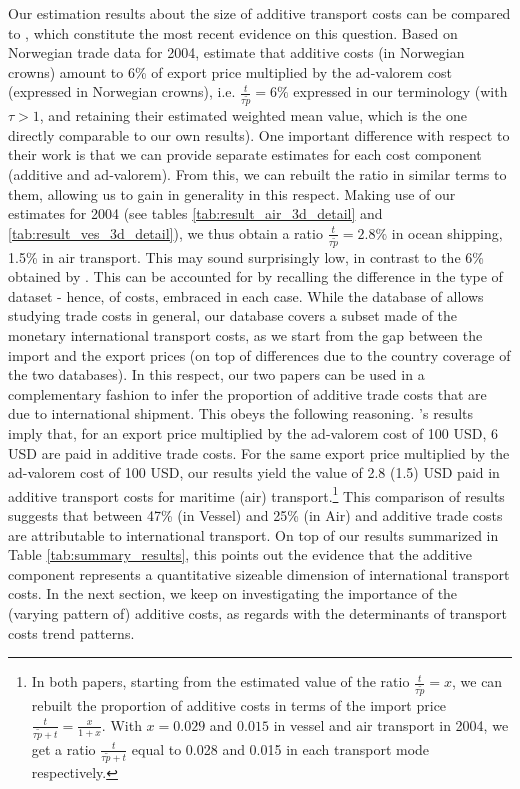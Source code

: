 \documentclass[a4paper,11pt]{article}
\begin{document}
Our estimation results about the size of additive transport costs can be compared to \citet{Irrazabal_2015}, which constitute the most recent evidence on this question. Based on Norwegian trade data for 2004, \citet{Irrazabal_2015} estimate that additive costs (in Norwegian crowns) amount to 6\% of export price multiplied by the ad-valorem cost (expressed in Norwegian crowns), i.e. $\frac{t}{\tau\widetilde{p}}=6\%$ expressed in our terminology (with $\tau>1$, and retaining their estimated weighted mean value, which is the one directly comparable to our own results). One important difference with respect to their work is that we can provide separate estimates for each cost component (additive and ad-valorem). From this, we can rebuilt the ratio in similar terms to them, allowing us to gain in generality in this respect. Making use of our estimates for 2004 (see tables \ref{tab:result_air_3d_detail} and \ref{tab:result_ves_3d_detail}), we thus obtain a ratio $\frac{t}{\tau\widetilde{p}}=2.8\%$ in ocean shipping, 1.5\% in air transport. This may sound surprisingly low, in contrast to the 6\% obtained by \citet{Irrazabal_2015}. This can be accounted for by recalling the difference in the type of dataset - hence, of costs, embraced in each case. While the database of \citet{Irrazabal_2015} allows studying trade costs in general, our database covers a subset made of the monetary international transport costs, as we start from the gap between the import and the export prices (on top of differences due to the country coverage of the two databases). In this respect, our two papers can be used in a complementary fashion to infer the proportion of additive trade costs that are due to international shipment. This obeys the following reasoning. \citet{Irrazabal_2015}'s results imply that, for an export price multiplied by the ad-valorem cost of 100 USD, 6 USD are paid in additive trade costs. For the same export price multiplied by the ad-valorem cost of 100 USD, our results yield the value of 2.8 (1.5) USD paid in additive transport costs for maritime (air) transport.\footnote{In both papers, starting from the estimated value of the ratio $\frac{t}{\tau \widetilde{p}}= x$, we can rebuilt the proportion of additive costs in terms of the import price $\frac{t}{\tau \widetilde{p} + t} = \frac{x}{1+x}$. With $x = 0.029$ and $0.015$ in vessel and air transport in 2004, we get a ratio $\frac{t}{\tau \widetilde{p} + t}$ equal to 0.028 and 0.015 in each transport mode respectively.} This comparison of results suggests that between 47\% (in Vessel) and 25\% (in Air) and   additive trade costs are attributable to international transport. On top of our results summarized in Table \ref{tab:summary_results}, this points out the evidence that the additive component represents a quantitative sizeable dimension of international transport costs. In the next section, we keep on investigating the importance of the (varying pattern of) additive costs, as regards with the determinants of transport costs trend patterns.
\end{document}
